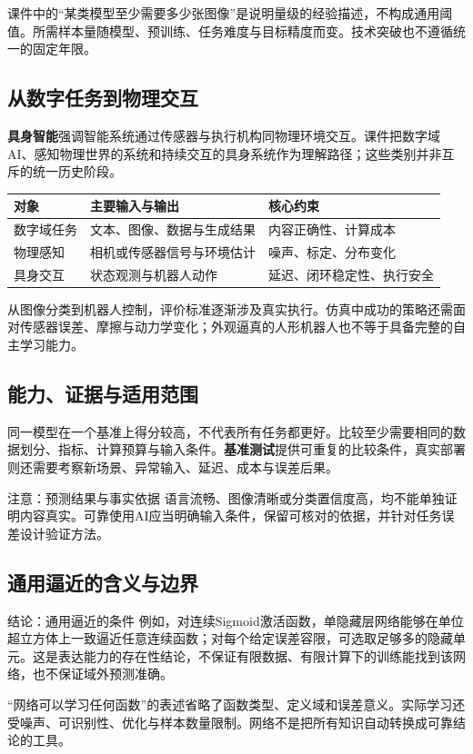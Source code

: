 \documentclass[UTF8,fontset=none,zihao=-4,a4paper]{ctexart}
\newcommand{\term}[1]{\textbf{#1}}
\begin{document}
课件中的“某类模型至少需要多少张图像”是说明量级的经验描述，不构成通用阈值。所需样本量随模型、预训练、任务难度与目标精度而变。技术突破也不遵循统一的固定年限。

\subsection{从数字任务到物理交互}
\term{具身智能}强调智能系统通过传感器与执行机构同物理环境交互。课件把数字域AI、感知物理世界的系统和持续交互的具身系统作为理解路径；这些类别并非互斥的统一历史阶段。

\begin{center}
\begin{tabularx}{\linewidth}{lYY}
\toprule 对象 & 主要输入与输出 & 核心约束\\\midrule
数字域任务 & 文本、图像、数据与生成结果 & 内容正确性、计算成本\\
物理感知 & 相机或传感器信号与环境估计 & 噪声、标定、分布变化\\
具身交互 & 状态观测与机器人动作 & 延迟、闭环稳定性、执行安全\\\bottomrule
\end{tabularx}
\end{center}
从图像分类到机器人控制，评价标准逐渐涉及真实执行。仿真中成功的策略还需面对传感器误差、摩擦与动力学变化；外观逼真的人形机器人也不等于具备完整的自主学习能力。

\subsection{能力、证据与适用范围}
同一模型在一个基准上得分较高，不代表所有任务都更好。比较至少需要相同的数据划分、指标、计算预算与输入条件。\term{基准测试}提供可重复的比较条件，真实部署则还需要考察新场景、异常输入、延迟、成本与误差后果。

\begin{infobox}{注意：预测结果与事实依据}
语言流畅、图像清晰或分类置信度高，均不能单独证明内容真实。可靠使用AI应当明确输入条件，保留可核对的依据，并针对任务误差设计验证方法。
\end{infobox}

\subsection{通用逼近的含义与边界}
\begin{infobox}{结论：通用逼近的条件}
例如，对连续Sigmoid激活函数，单隐藏层网络能够在单位超立方体上一致逼近任意连续函数；对每个给定误差容限，可选取足够多的隐藏单元。这是表达能力的存在性结论，不保证有限数据、有限计算下的训练能找到该网络，也不保证域外预测准确。
\end{infobox}
“网络可以学习任何函数”的表述省略了函数类型、定义域和误差意义。实际学习还受噪声、可识别性、优化与样本数量限制。网络不是把所有知识自动转换成可靠结论的工具。
\end{document}

